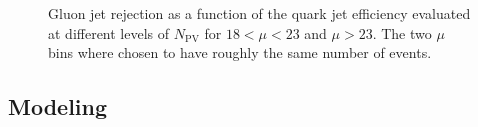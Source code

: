 \begin{figure}[htpb]
\begin{center}
\caption{Gluon jet rejection as a function of the quark jet efficiency 
evaluated at different levels of $N_\text{PV}$ for \protect{} $18<\mu<23$ and \protect{}  $\mu > 23$.
The two $\mu$ bins where chosen to have roughly the same number of events.}
\label{fig:cnn-pileup2}
\end{center}
\end{figure}


\subsection{Modeling}


